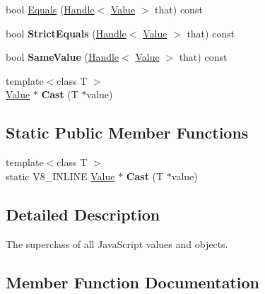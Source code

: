 \begin{DoxyCompactItemize}
\item 
bool \hyperlink{classv8_1_1Value_adc2a7a92a120675bbd4c992163a20869}{Equals} (\hyperlink{classv8_1_1Handle}{Handle}$<$ \hyperlink{classv8_1_1Value}{Value} $>$ that) const 
\item 
\hypertarget{classv8_1_1Value_abb564818715b818957adc97716a076ba}{}bool {\bfseries Strict\+Equals} (\hyperlink{classv8_1_1Handle}{Handle}$<$ \hyperlink{classv8_1_1Value}{Value} $>$ that) const \label{classv8_1_1Value_abb564818715b818957adc97716a076ba}

\item 
\hypertarget{classv8_1_1Value_a7e49ca617f5d1773a81bae18a8062084}{}bool {\bfseries Same\+Value} (\hyperlink{classv8_1_1Handle}{Handle}$<$ \hyperlink{classv8_1_1Value}{Value} $>$ that) const \label{classv8_1_1Value_a7e49ca617f5d1773a81bae18a8062084}

\item 
\hypertarget{classv8_1_1Value_ac2142bb3ec6527633c4f9133e80cdc19}{}{\footnotesize template$<$class T $>$ }\\\hyperlink{classv8_1_1Value}{Value} $\ast$ {\bfseries Cast} (T $\ast$value)\label{classv8_1_1Value_ac2142bb3ec6527633c4f9133e80cdc19}

\end{DoxyCompactItemize}
\subsection*{Static Public Member Functions}
\begin{DoxyCompactItemize}
\item 
\hypertarget{classv8_1_1Value_ae5aa9b54ebed55819c3a4b2a3eb5fe12}{}{\footnotesize template$<$class T $>$ }\\static V8\+\_\+\+I\+N\+L\+I\+N\+E \hyperlink{classv8_1_1Value}{Value} $\ast$ {\bfseries Cast} (T $\ast$value)\label{classv8_1_1Value_ae5aa9b54ebed55819c3a4b2a3eb5fe12}

\end{DoxyCompactItemize}


\subsection{Detailed Description}
The superclass of all Java\+Script values and objects. 

\subsection{Member Function Documentation}
\hypertarget{classv8_1_1Value_adc2a7a92a120675bbd4c992163a20869}{}
